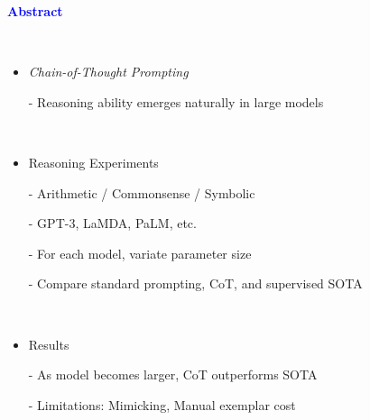 \documentclass[professionalfont]{beamer}
\begin{document}
\frame{\titlepage}

\begin{frame}
\begin{center}
    { \textbf{\textcolor{blue}{ {\fontsize{12}{14}\selectfont Abstract} }} }
\end{center}
\\[0.5cm]

{\fontsize{10}{14}\selectfont 
\begin{itemize}
    \item \textit{Chain-of-Thought Prompting}
    
    - Reasoning ability emerges naturally in large models

    \\[0.2cm]
    
    \item Reasoning Experiments

    - Arithmetic / Commonsense / Symbolic

    - GPT-3, LaMDA, PaLM, etc.

    - For each model, variate parameter size

    - Compare standard prompting, CoT, and supervised SOTA

    \\[0.2cm]

    \item Results

    - As model becomes larger, CoT outperforms SOTA

    - Limitations: Mimicking, Manual exemplar cost
\end{itemize}
}

\end{frame}
\end{document}
